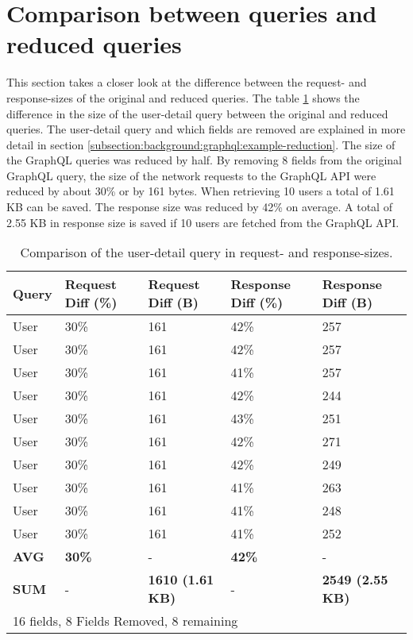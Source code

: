 \section{Comparison between queries and reduced queries}

This section takes a closer look at the difference between the request- and response-sizes of the original and reduced queries. The table \ref{table:code:comparison-user-reduction} shows the difference in the size of the user-detail query between the original and reduced queries. The user-detail query and which fields are removed are explained in more detail in section \ref{subsection:background:graphql:example-reduction}.
The size of the GraphQL queries was reduced by half. By removing 8 fields from the original GraphQL query, the size of the network requests to the GraphQL \ac{API} were reduced by about 30\% or by 161 bytes. When retrieving 10 users a total of 1.61 KB can be saved. The response size was reduced by 42\% on average. A total of 2.55 KB in response size is saved if 10 users are fetched from the GraphQL \ac{API}.

\ifshowTables
\begin{table}[H]
  \begin{tabular}{|l|l|l|l|l|}
  \hline
  Query & Request Diff (\%) & Request Diff (B) & Response Diff (\%) & Response Diff (B) \\
  \hline
  User & 30\% & 161 & 42\% & 257 \\
  \hline
  User & 30\% & 161 & 42\% & 257 \\
  \hline
  User & 30\% & 161 & 41\% & 257 \\
  \hline
  User & 30\% & 161 & 42\% & 244 \\
  \hline
  User & 30\% & 161 & 43\% & 251 \\
  \hline
  User & 30\% & 161 & 42\% & 271 \\
  \hline
  User & 30\% & 161 & 42\% & 249 \\
  \hline
  User & 30\% & 161 & 41\% & 263 \\
  \hline
  User & 30\% & 161 & 41\% & 248 \\
  \hline
  User & 30\% & 161 & 41\% & 252 \\
  \hline
  \hline
  \textbf{AVG} & \textbf{30\%} & - & \textbf{42\%} & -  \\
  \hline
  \hline
  \textbf{SUM} & - & \textbf{1610 (1.61 KB)} & - & \textbf{2549 (2.55 KB)} \\
  \hline
  \multicolumn{5}{l}{16 fields, 8 Fields Removed, 8 remaining}
  \end{tabular}
  \caption{Comparison of the user-detail query in request- and response-sizes.}\label{table:code:comparison-user-reduction}
\end{table}
\fi

